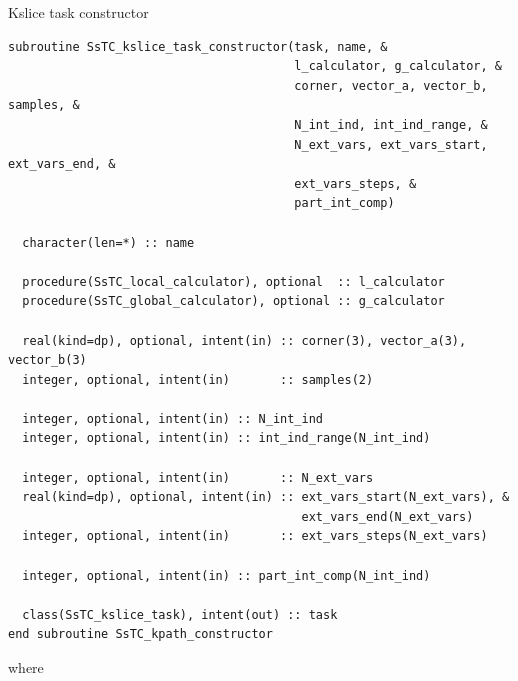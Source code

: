 \documentclass[10pt,a4paper]{article}
\begin{document}
\begin{codebox}{Kslice task constructor}
\begin{lstlisting}[caption={Interface of the ``kslice" constructor.},captionpos=b]
subroutine SsTC_kslice_task_constructor(task, name, &
                                        l_calculator, g_calculator, &
                                        corner, vector_a, vector_b, samples, &
                                        N_int_ind, int_ind_range, &
                                        N_ext_vars, ext_vars_start, ext_vars_end, &
                                        ext_vars_steps, &
                                        part_int_comp)

  character(len=*) :: name

  procedure(SsTC_local_calculator), optional  :: l_calculator
  procedure(SsTC_global_calculator), optional :: g_calculator

  real(kind=dp), optional, intent(in) :: corner(3), vector_a(3), vector_b(3)
  integer, optional, intent(in)       :: samples(2)

  integer, optional, intent(in) :: N_int_ind
  integer, optional, intent(in) :: int_ind_range(N_int_ind)

  integer, optional, intent(in)       :: N_ext_vars
  real(kind=dp), optional, intent(in) :: ext_vars_start(N_ext_vars), &
                                         ext_vars_end(N_ext_vars)
  integer, optional, intent(in)       :: ext_vars_steps(N_ext_vars)

  integer, optional, intent(in) :: part_int_comp(N_int_ind)

  class(SsTC_kslice_task), intent(out) :: task
end subroutine SsTC_kpath_constructor
\end{lstlisting}
\end{codebox}
where
\end{document}
